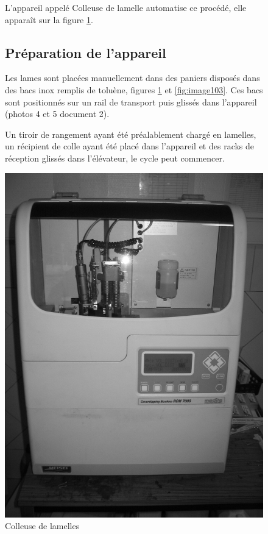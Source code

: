\begin{figure}[htbp]
\begin{minipage}[c]{.55\linewidth}
L'appareil appelé \og Colleuse de lamelle \fg automatise ce procédé, elle apparaît sur la figure \ref{fig:image102}.

\subsection{Préparation de l'appareil}

Les lames sont placées manuellement dans des paniers disposés dans des bacs inox remplis de toluène, figures \ref{fig:image102} et \ref{fig:image103}. Ces bacs sont positionnés sur un rail de transport puis glissés dans l'appareil (photos 4 et 5 document 2).

Un tiroir de rangement ayant été préalablement chargé en lamelles, un récipient de colle ayant été placé dans l'appareil et des racks de réception glissés dans l'élévateur, le cycle peut commencer.
\end{minipage}
\hfill
\begin{minipage}[c]{.40\linewidth}
\begin{center}
\includegraphics[width=0.8\linewidth]{img/colleuse.jpg}
\caption{Colleuse de lamelles}
\label{fig:image102}
\end{center}
\end{minipage}
\end{figure}

